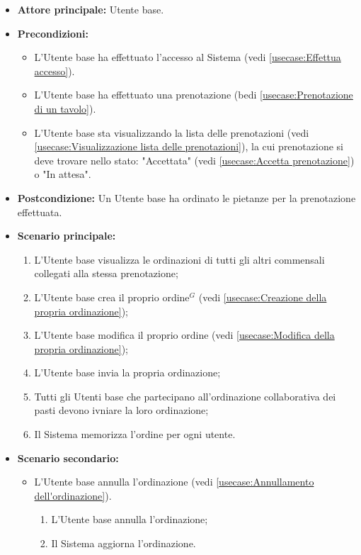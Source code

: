 \begin{itemize}
	\item \textbf{Attore principale:} Utente base.

	\item \textbf{Precondizioni:}
	      \begin{itemize}
		      \item L'Utente base ha effettuato l'accesso al Sistema (vedi \autoref{usecase:Effettua accesso}).
		      \item L'Utente base ha effettuato una prenotazione (bedi \autoref{usecase:Prenotazione di un tavolo}).
		      \item L'Utente base sta visualizzando la lista delle prenotazioni (vedi \autoref{usecase:Visualizzazione lista delle prenotazioni}), la cui prenotazione si deve trovare nello stato: "Accettata"  (vedi \autoref{usecase:Accetta prenotazione}) o "In attesa".
	      \end{itemize}

	\item \textbf{Postcondizione:} Un Utente base ha ordinato le pietanze per la prenotazione effettuata.

	\item \textbf{Scenario principale:}
	      \begin{enumerate}
		      \item L'Utente base visualizza le ordinazioni di tutti gli altri commensali collegati alla stessa prenotazione;
		      \item L'Utente base crea il proprio ordine$^G$ (vedi \autoref{usecase:Creazione della propria ordinazione});
		      \item L'Utente base modifica il proprio ordine (vedi \autoref{usecase:Modifica della propria ordinazione});

		      \item L'Utente base invia la propria ordinazione;

		      \item Tutti gli Utenti base che partecipano all'ordinazione collaborativa dei pasti devono
		            ivniare la loro ordinazione;
		      \item Il Sistema memorizza l'ordine per ogni utente.
	      \end{enumerate}

	\item \textbf{Scenario secondario:}
	      \begin{itemize}
		      \item L'Utente base annulla l'ordinazione (vedi
		            \autoref{usecase:Annullamento dell'ordinazione}).
		            \begin{enumerate}
			            \item L'Utente base annulla l'ordinazione;
			            \item Il Sistema aggiorna l'ordinazione.
		            \end{enumerate}
	      \end{itemize}
\end{itemize}


